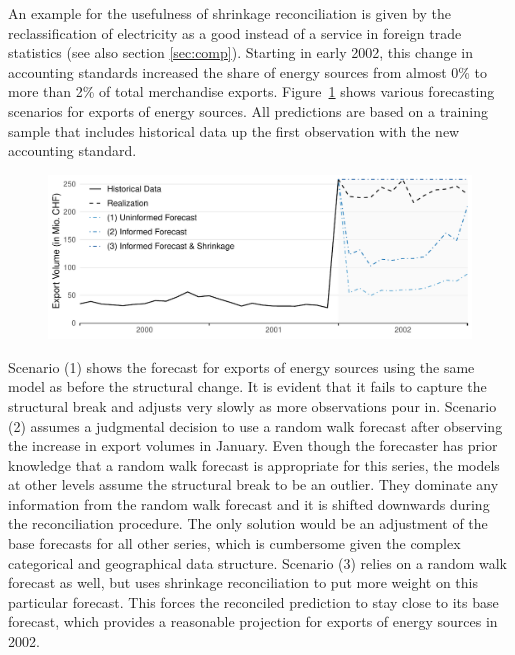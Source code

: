 \documentclass[a4paper,fleqn,11pt]{article}
\begin{document}
An example for the usefulness of shrinkage reconciliation is given by the reclassification of electricity as a good instead of a service in foreign trade statistics (see also section \ref{sec:comp}). Starting in early 2002, this change in accounting standards increased the share of energy sources from almost 0\% to more than 2\% of total merchandise exports. Figure~\ref{fig:electricity} shows various forecasting scenarios for exports of energy sources. All predictions are based on a training sample that includes historical data up the first observation with the new accounting standard. 
\begin{figure}[H]
	\includegraphics[width=\textwidth]{fig/fig_electricity}
	\label{fig:electricity}
\end{figure}
Scenario (1) shows the forecast for exports of energy sources using the same model as before the structural change. It is evident that it fails to capture the structural break and adjusts very slowly as more observations pour in. Scenario (2) assumes a judgmental decision to use a random walk forecast after observing the increase in export volumes in January. Even though the forecaster has prior knowledge that a random walk forecast is appropriate for this series, the models at other levels assume the structural break to be an outlier. They dominate any information from the random walk forecast and it is shifted downwards during the reconciliation procedure. The only solution would be an adjustment of the base forecasts for all other series, which is cumbersome given the complex categorical and geographical data structure. Scenario (3) relies on a random walk forecast as well, but uses shrinkage reconciliation to put more weight on this particular forecast. This forces the reconciled prediction to stay close to its base forecast, which provides a reasonable projection for exports of energy sources in 2002.
\end{document}
